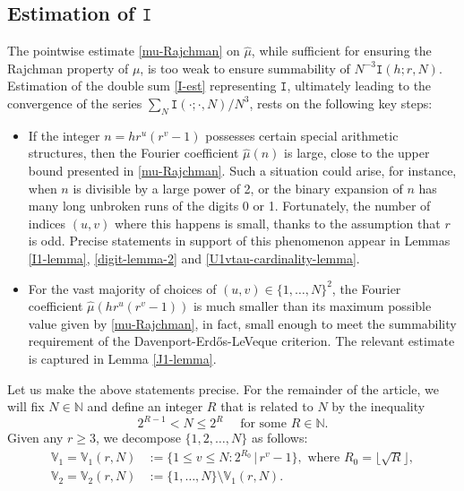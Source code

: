 \documentclass[12pt, twoside]{article}
\theoremstyle{definition}
\numberwithin{equation}{section}
\begin{document}
\subsection{Estimation of $\mathtt I$} \label{I-est-section}
The pointwise estimate \eqref{mu-Rajchman} on $\widehat{\mu}$, while sufficient for ensuring the Rajchman property of $\mu$, is too weak to ensure summability  of $N^{-3} \mathtt I(h; r, N)$. Estimation of the double sum \eqref{I-est} representing $\mathtt I$, ultimately leading to the convergence of the series $\sum_N \mathtt I(\cdot ; \cdot, N)/N^3$, rests on the following key steps: 
\begin{itemize} 
\item If the integer $n=hr^u(r^v-1)$ possesses certain special arithmetic structures, then the Fourier coefficient $\widehat{\mu}(n)$ is large, close to the upper bound presented in \eqref{mu-Rajchman}. Such a situation could arise, for instance, when $n$ is divisible by a large power of 2, or the binary expansion of $n$ has many long unbroken runs of the digits 0 or 1. Fortunately, the number of indices $(u,v)$ where this happens is small, thanks to the assumption that $r$ is odd. Precise statements in support of this phenomenon appear in Lemmas \ref{I1-lemma}, \ref{digit-lemma-2} and \ref{U1vtau-cardinality-lemma}.
\vskip0.1in
\item For the vast majority of choices of $(u, v) \in \{1, \ldots, N\}^2$, the Fourier coefficient $\widehat{\mu}(hr^u(r^v-1))$ is much smaller than its maximum possible value given by \eqref{mu-Rajchman}, in fact, small enough to meet the summability requirement of the Davenport-Erd\H{o}s-LeVeque criterion. The relevant estimate is captured in Lemma \ref{J1-lemma}.         
\end{itemize} 
Let us make the above statements precise. For the remainder of the article, we will fix $N \in \mathbb N$ and define an integer $R$ that is related to $N$ by the inequality  
\begin{equation} \label{N-and-R}
2^{R-1} < N \leq 2^R \quad \text{ for some } R \in \mathbb N.   
\end{equation} 
Given any $r \geq 3$, we decompose $\{1, 2, \ldots, N\}$ as follows: 
\begin{align}
\mathbb V_1 = \mathbb V_1(r, N) &:= \bigl\{1 \leq v \leq N : 2^{R_0} \, | \, r^{v}-1 \bigr\}, \text{ where } R_0 = \lfloor \sqrt{R} \rfloor, \label{def-W1} \\ 
\mathbb V_2 = \mathbb V_2(r, N) &:= \bigl\{1, \ldots, N\} \setminus \mathbb V_1(r, N).  \label{def-W2}  
\end{align}
\end{document}
